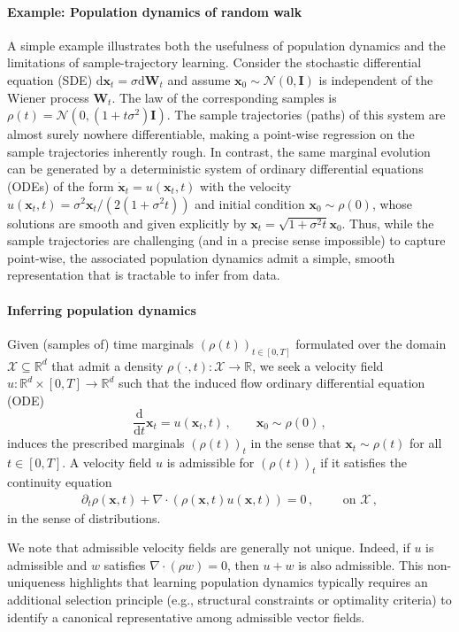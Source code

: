 \documentclass{article}
\newcommand{\bfx}{\boldsymbol{x}}
\theoremstyle{definition}
\newcommand{\bfW}{\boldsymbol{W}}
\newcommand{\bfI}{\boldsymbol{I}}
\theoremstyle{plain}
\theoremstyle{definition}
\theoremstyle{remark}
\begin{document}
\paragraph{Example: Population dynamics of random walk}
A simple example illustrates both the usefulness of population dynamics and the limitations of sample-trajectory learning. Consider the stochastic differential equation (SDE) $\mathrm d \bfx_t = \sigma \mathrm d \mathbf{W}_t$ and assume $\bfx_0 \sim \mathcal{N}(0, \bfI)$ is independent of the Wiener process $\bfW_t$. The law of the corresponding samples is $\rho(t) = \mathcal{N}(0, (1 + t\sigma^2)\bfI)$. The sample trajectories (paths) of this system are almost surely nowhere differentiable, making a point-wise regression on the sample trajectories inherently rough. In contrast, the same marginal evolution can be generated by a deterministic system of ordinary differential equations (ODEs) of the form $\dot{\bfx}_t = u(\bfx_t, t)$ with the velocity $u(\bfx_t, t) = \sigma^2 \bfx_t/(2(1 + \sigma^2 t))$ and initial condition $\bfx_0 \sim \rho(0)$, whose solutions are smooth and given explicitly by $\bfx_t = \sqrt{1 + \sigma^2 t}\bfx_0$. Thus, while the sample trajectories are challenging (and in a precise sense impossible) to capture point-wise, the associated population dynamics admit a simple, smooth representation that is tractable to infer from data. 

\paragraph{Inferring population dynamics}
Given (samples of) time marginals $(\rho(t))_{t \in [0, T]}$ formulated over the domain $\mathcal{X} \subseteq \mathbb{R}^d$ that admit a density $\rho(\cdot, t): \mathcal{X} \to \mathbb{R}$, we seek a velocity field $u: \mathbb{R}^d \times [0, T] \to \mathbb{R}^d$ such that the induced flow ordinary differential equation (ODE)
\[
\frac{\mathrm d}{\mathrm dt} \bfx_t = u(\bfx_t, t)\,,\qquad \bfx_0 \sim \rho(0)\,,
\]
induces the prescribed marginals $(\rho(t))_t$ in the sense that $\bfx_t \sim \rho(t)$ for all $t \in [0, T]$. A velocity field $u$ is admissible for $(\rho(t))_t$ if it satisfies the continuity equation
\begin{align}
\label{eq:conti_eq}
    \partial_t \rho(\bfx, t) + \nabla \cdot (\rho( \bfx, t) u(\bfx, t)) = 0\,,\qquad \text{ on } \mathcal{X}\,,
\end{align}
in the sense of distributions.

We note that admissible velocity fields are generally not unique. Indeed, if $u$ is admissible and $w$ satisfies $\nabla\cdot(\rho w)=0$, then $u+w$ is also admissible. 
This non-uniqueness highlights that learning population dynamics typically requires an additional selection principle (e.g., structural constraints or optimality criteria) to identify a canonical representative among admissible vector fields.
\end{document}
